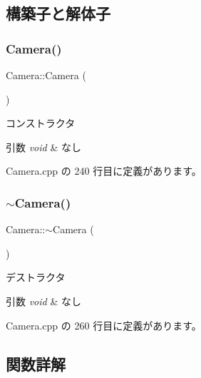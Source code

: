 \subsection{構築子と解体子}
\mbox{\label{class_camera_a01f94c3543f56ede7af49dc778f19331}} 
\subsubsection{\texorpdfstring{Camera()}{Camera()}}
{\footnotesize\ttfamily Camera\+::\+Camera (\begin{DoxyParamCaption}{ }\end{DoxyParamCaption})}



コンストラクタ 


\begin{DoxyParams}{引数}
{\em void} & なし \\
\hline
\end{DoxyParams}


 Camera.\+cpp の 240 行目に定義があります。

\mbox{\label{class_camera_ad1897942d0ccf91052386388a497349f}} 
\subsubsection{\texorpdfstring{$\sim$\+Camera()}{~Camera()}}
{\footnotesize\ttfamily Camera\+::$\sim$\+Camera (\begin{DoxyParamCaption}{ }\end{DoxyParamCaption})}



デストラクタ 


\begin{DoxyParams}{引数}
{\em void} & なし \\
\hline
\end{DoxyParams}


 Camera.\+cpp の 260 行目に定義があります。



\subsection{関数詳解}
\mbox{\label{class_camera_a9eb4faceb2a0cf81a9ec9600de03e42d}} 
